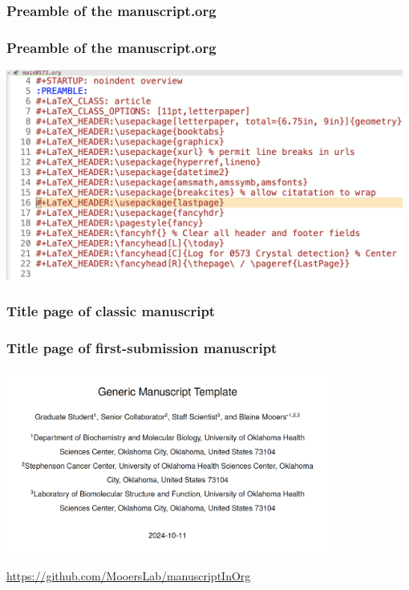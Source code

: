 \documentclass[aspectratio=169]{beamer}
\begin{document}
\subsubsection{Preamble of the manuscript.org}
\begin{frame}
\frametitle{Preamble of the manuscript.org}
\begin{center}
    \includegraphics[width=0.98\textwidth, angle=0]{./Figures/manuscriptPreamble.png}
\end{center}
\end{frame}
\note{

}



\subsubsection{Title page of classic manuscript}
\begin{frame}
\frametitle{Title page of first-submission manuscript}
\begin{center}
    \includegraphics[width=0.8\textwidth, angle=0]{./Figures/manuscriptTitle.png}
\end{center}
\url{https://github.com/MooersLab/manuscriptInOrg}
\end{frame}
\end{document}
